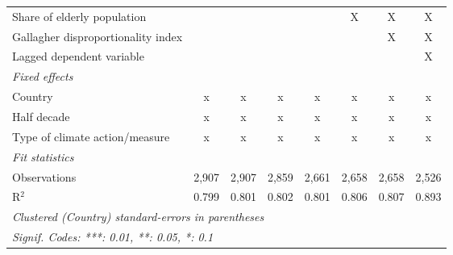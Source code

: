 \begin{tabular}{lccccccc}
   Share of elderly population                                        &               &               &                &               & X              & X              & X\\  
   Gallagher disproportionality index                                 &               &               &                &               &                & X              & X\\  
   Lagged dependent variable                                          &               &               &                &               &                &                & X\\  
   \emph{Fixed effects}\\
   Country                                                            & x             & x             & x              & x             & x              & x              & x\\  
   Half decade                                                        & x             & x             & x              & x             & x              & x              & x\\  
   Type of climate action/measure                                     & x             & x             & x              & x             & x              & x              & x\\  
   \midrule \emph{Fit statistics}\\
   Observations                                                       & 2,907         & 2,907         & 2,859          & 2,661         & 2,658          & 2,658          & 2,526\\  
   R$^2$                                                              & 0.799         & 0.801         & 0.802          & 0.801         & 0.806          & 0.807          & 0.893\\  
   \midrule
   \multicolumn{8}{l}{\emph{Clustered (Country) standard-errors in parentheses}}\\
   \multicolumn{8}{l}{\emph{Signif. Codes: ***: 0.01, **: 0.05, *: 0.1}}\\
\end{tabular}
\par\endgroup


